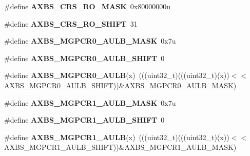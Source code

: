\begin{DoxyCompactItemize}
\item 
\#define {\bfseries A\+X\+B\+S\+\_\+\+C\+R\+S\+\_\+\+R\+O\+\_\+\+M\+A\+SK}~0x80000000u\hypertarget{group__AXBS__Register__Masks_gac511a1f4f6590cd86da388390b2993b5}{}\label{group__AXBS__Register__Masks_gac511a1f4f6590cd86da388390b2993b5}

\item 
\#define {\bfseries A\+X\+B\+S\+\_\+\+C\+R\+S\+\_\+\+R\+O\+\_\+\+S\+H\+I\+FT}~31\hypertarget{group__AXBS__Register__Masks_ga51572e77d4fe6c519be097a8e6324331}{}\label{group__AXBS__Register__Masks_ga51572e77d4fe6c519be097a8e6324331}

\item 
\#define {\bfseries A\+X\+B\+S\+\_\+\+M\+G\+P\+C\+R0\+\_\+\+A\+U\+L\+B\+\_\+\+M\+A\+SK}~0x7u\hypertarget{group__AXBS__Register__Masks_ga161e38235a1d3154067e078e559202fd}{}\label{group__AXBS__Register__Masks_ga161e38235a1d3154067e078e559202fd}

\item 
\#define {\bfseries A\+X\+B\+S\+\_\+\+M\+G\+P\+C\+R0\+\_\+\+A\+U\+L\+B\+\_\+\+S\+H\+I\+FT}~0\hypertarget{group__AXBS__Register__Masks_ga2c00c30d63906c765a6df81778e2fb4f}{}\label{group__AXBS__Register__Masks_ga2c00c30d63906c765a6df81778e2fb4f}

\item 
\#define {\bfseries A\+X\+B\+S\+\_\+\+M\+G\+P\+C\+R0\+\_\+\+A\+U\+LB}(x)~(((uint32\+\_\+t)(((uint32\+\_\+t)(x))$<$$<$A\+X\+B\+S\+\_\+\+M\+G\+P\+C\+R0\+\_\+\+A\+U\+L\+B\+\_\+\+S\+H\+I\+FT))\&A\+X\+B\+S\+\_\+\+M\+G\+P\+C\+R0\+\_\+\+A\+U\+L\+B\+\_\+\+M\+A\+SK)\hypertarget{group__AXBS__Register__Masks_ga1a52b7004338c3caf87bc34f75bab14b}{}\label{group__AXBS__Register__Masks_ga1a52b7004338c3caf87bc34f75bab14b}

\item 
\#define {\bfseries A\+X\+B\+S\+\_\+\+M\+G\+P\+C\+R1\+\_\+\+A\+U\+L\+B\+\_\+\+M\+A\+SK}~0x7u\hypertarget{group__AXBS__Register__Masks_gaefd2ffd8d80f4eb9fd14f3c5a3a7b629}{}\label{group__AXBS__Register__Masks_gaefd2ffd8d80f4eb9fd14f3c5a3a7b629}

\item 
\#define {\bfseries A\+X\+B\+S\+\_\+\+M\+G\+P\+C\+R1\+\_\+\+A\+U\+L\+B\+\_\+\+S\+H\+I\+FT}~0\hypertarget{group__AXBS__Register__Masks_gab45b6c2302bbf061fd1c43d436659bd7}{}\label{group__AXBS__Register__Masks_gab45b6c2302bbf061fd1c43d436659bd7}

\item 
\#define {\bfseries A\+X\+B\+S\+\_\+\+M\+G\+P\+C\+R1\+\_\+\+A\+U\+LB}(x)~(((uint32\+\_\+t)(((uint32\+\_\+t)(x))$<$$<$A\+X\+B\+S\+\_\+\+M\+G\+P\+C\+R1\+\_\+\+A\+U\+L\+B\+\_\+\+S\+H\+I\+FT))\&A\+X\+B\+S\+\_\+\+M\+G\+P\+C\+R1\+\_\+\+A\+U\+L\+B\+\_\+\+M\+A\+SK)\hypertarget{group__AXBS__Register__Masks_ga80c64ff55917829c1d7c876966469c92}{}\label{group__AXBS__Register__Masks_ga80c64ff55917829c1d7c876966469c92}


\end{DoxyCompactItemize}
